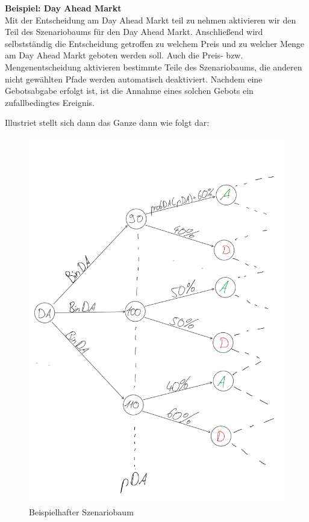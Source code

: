 \documentclass{article}
\begin{document}
\textbf{Beispiel: Day Ahead Markt}\\
Mit der Entscheidung am Day Ahead Markt teil zu nehmen aktivieren wir den Teil des Szenariobaums für den Day Ahead Markt. Anschließend wird selbstständig die Entscheidung getroffen zu welchem Preis und zu welcher Menge am Day Ahead Markt geboten werden soll. Auch die Preis- bzw. Mengenentscheidung aktivieren bestimmte Teile des Szenariobaums, die anderen nicht gewählten Pfade werden automatisch deaktiviert. Nachdem eine Gebotsabgabe erfolgt ist, ist die Annahme eines solchen Gebots ein zufallbedingtes Ereignis.

Illustriet stellt sich dann das Ganze dann wie folgt dar:
\begin{figure}[H]
    \centering
    \includegraphics[width=1\linewidth]{pictures/szBaumBeispiel1.png}
    \caption{Beispielhafter Szenariobaum}
    \label{fig:enter-label}
\end{figure}
\end{document}
